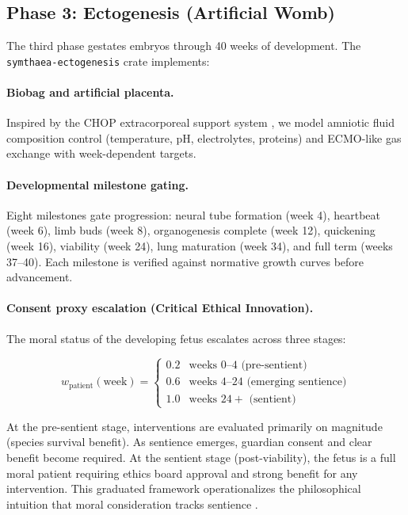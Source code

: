 \documentclass[11pt,letterpaper]{article}
\begin{document}
\subsection{Phase 3: Ectogenesis (Artificial Womb)}

The third phase gestates embryos through 40 weeks of development. The
\texttt{symthaea-ectogenesis} crate implements:

\paragraph{Biobag and artificial placenta.} Inspired by the CHOP extracorporeal
support system \cite{partridge2017biobag}, we model amniotic fluid composition
control (temperature, pH, electrolytes, proteins) and ECMO-like gas exchange
with week-dependent targets.

\paragraph{Developmental milestone gating.} Eight milestones gate progression:
neural tube formation (week 4), heartbeat (week 6), limb buds (week 8),
organogenesis complete (week 12), quickening (week 16), viability (week 24),
lung maturation (week 34), and full term (weeks 37--40). Each milestone is
verified against normative growth curves before advancement.

\paragraph{Consent proxy escalation (Critical Ethical Innovation).} The moral
status of the developing fetus escalates across three stages:

\begin{equation}
w_\text{patient}(\text{week}) =
\begin{cases}
0.2 & \text{weeks } 0\text{--}4 \text{ (pre-sentient)} \\
0.6 & \text{weeks } 4\text{--}24 \text{ (emerging sentience)} \\
1.0 & \text{weeks } 24+ \text{ (sentient)}
\end{cases}
\label{eq:consent}
\end{equation}

At the pre-sentient stage, interventions are evaluated primarily on magnitude
(species survival benefit). As sentience emerges, guardian consent and clear
benefit become required. At the sentient stage (post-viability), the fetus is a
full moral patient requiring ethics board approval and strong benefit for any
intervention. This graduated framework operationalizes the philosophical
intuition that moral consideration tracks sentience
\cite{singer2011practical,beauchamp2019principles}.
\end{document}
